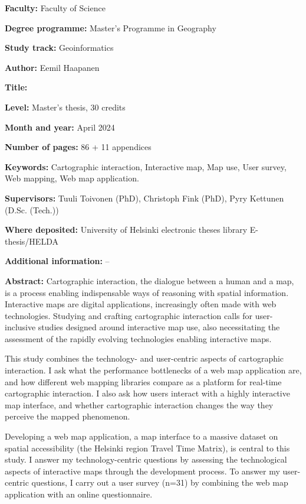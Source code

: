 \begin{spacing}{1}
\setlength{\parskip}{4pt}

\textbf{Faculty:} Faculty of Science

\textbf{Degree programme:} Master's Programme in Geography

\textbf{Study track:} Geoinformatics

\textbf{Author:} Eemil Haapanen

\textbf{Title:} \mytitle

\textbf{Level:} Master's thesis, 30 credits

\textbf{Month and year:} April 2024  %

\textbf{Number of pages:} 86 + 11 appendices  %

\textbf{Keywords:}
Cartographic interaction,
Interactive map,
Map use,
User survey,
Web mapping,
Web map application.

\textbf{Supervisors:} Tuuli Toivonen (PhD), Christoph Fink (PhD), Pyry Kettunen (D.Sc. (Tech.))

\textbf{Where deposited:} University of Helsinki electronic theses library E-thesis/HELDA

\textbf{Additional information:} --

\textbf{Abstract:}
Cartographic interaction, the dialogue between a human and a map, is
a process enabling indispensable ways of reasoning with spatial information.
Interactive maps are digital applications,
increasingly often made with web technologies.
Studying and crafting cartographic interaction calls for
user-inclusive studies designed around interactive map use,
also necessitating the assessment of the rapidly evolving technologies enabling interactive maps.

This study combines the technology- and user-centric aspects of cartographic interaction.
I ask what the performance bottlenecks of a web map application are,
and how different web mapping libraries compare as a platform for real-time cartographic interaction.
I also ask how users interact with a highly interactive map interface,
and whether cartographic interaction changes the way they perceive the mapped phenomenon.

Developing a web map application,
a map interface to a massive dataset on spatial accessibility (the Helsinki region Travel Time Matrix),
is central to this study.
I answer my technology-centric questions by assessing the technological aspects of interactive maps
through the development process.
To answer my user-centric questions,
I carry out a user survey (n=31) by combining the web map application with an online questionnaire.


\end{spacing}
